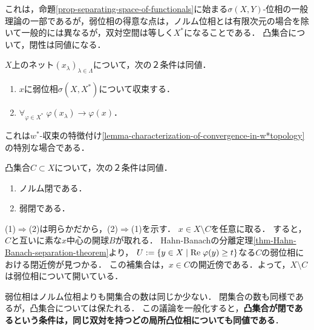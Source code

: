\documentclass[uplatex,dvipdfmx]{jsreport}
\begin{document}
\begin{tcolorbox}[colframe=ForestGreen, colback=ForestGreen!10!white,breakable,colbacktitle=ForestGreen!40!white,coltitle=black,fonttitle=\bfseries\sffamily,
    title=]
    これは，命題\ref{prop-separating-space-of-functionals}に始まる$\sigma(X,Y)$-位相の一般理論の一部であるが，弱位相の得意な点は，ノルム位相とは有限次元の場合を除いて一般的には異なるが，双対空間は等しく$X^*$になることである．
    凸集合について，閉性は同値になる．
\end{tcolorbox}

\begin{proposition}[弱収束は各点収束]\label{prop-characterization-of-convergence-in-wtopology}
    $X$上のネット$(x_\lambda)_{\lambda\in\Lambda}$について，次の２条件は同値．
    \begin{enumerate}
        \item $x$に弱位相$\sigma(X,X^*)$について収束する．
        \item $\forall_{\varphi\in X^*}\;\varphi(x_\lambda)\to\varphi(x)$．
    \end{enumerate}
\end{proposition}
\begin{remarks}
    これは$w^*$-収束の特徴付け\ref{lemma-characterization-of-convergence-in-w*topology}の特別な場合である．
\end{remarks}

\begin{proposition}\label{prop-closedness-of-convex-sets}
    凸集合$C\subset X$について，次の２条件は同値．
    \begin{enumerate}
        \item ノルム閉である．
        \item 弱閉である．
    \end{enumerate}
\end{proposition}
\begin{Proof}
    (1)$\Rightarrow$(2)は明らかだから，(2)$\Rightarrow$(1)を示す．
    $x\in X\setminus C$を任意に取る．
    すると，$C$と互いに素な$x$中心の開球$B$が取れる．
    Hahn-Banachの分離定理\ref{thm-Hahn-Banach-separation-theorem}より，
    $U:=\left\{y\in X\mid\mathrm{Re}\;\varphi(y)\ge t\right\}$なる$C$の弱位相における閉近傍が見つかる．
    この補集合は，$x\in C$の開近傍である．よって，$X\setminus C$は弱位相について開いている．
\end{Proof}
\begin{remarks}
    弱位相はノルム位相よりも開集合の数は同じか少ない．
    閉集合の数も同様であるが，凸集合については保たれる．
    この議論を一般化すると，\textbf{凸集合が閉であるという条件は，同じ双対を持つどの局所凸位相についても同値である}．
\end{remarks}
\end{document}
